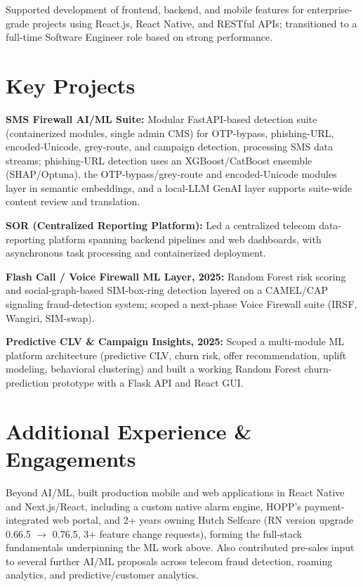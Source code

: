 \documentclass[10.5pt]{article}
\begin{document}
\begin{cvitems}
  \item Supported development of frontend, backend, and mobile features for enterprise-grade projects using React.js, React Native, and RESTful APIs; transitioned to a full-time Software Engineer role based on strong performance.
\end{cvitems}

\section*{Key Projects}
\begin{cvitems}
  \item \textbf{SMS Firewall AI/ML Suite:} Modular FastAPI-based detection suite (containerized modules, single admin CMS) for OTP-bypass, phishing-URL, encoded-Unicode, grey-route, and campaign detection, processing SMS data streams; phishing-URL detection uses an XGBoost/CatBoost ensemble (SHAP/Optuna), the OTP-bypass/grey-route and encoded-Unicode modules layer in semantic embeddings, and a local-LLM GenAI layer supports suite-wide content review and translation.
  \item \textbf{SOR (Centralized Reporting Platform):} Led a centralized telecom data-reporting platform spanning backend pipelines and web dashboards, with asynchronous task processing and containerized deployment.
  \item \textbf{Flash Call / Voice Firewall ML Layer, 2025:} Random Forest risk scoring and social-graph-based SIM-box-ring detection layered on a CAMEL/CAP signaling fraud-detection system; scoped a next-phase Voice Firewall suite (IRSF, Wangiri, SIM-swap).
  \item \textbf{Predictive CLV \& Campaign Insights, 2025:} Scoped a multi-module ML platform architecture (predictive CLV, churn risk, offer recommendation, uplift modeling, behavioral clustering) and built a working Random Forest churn-prediction prototype with a Flask API and React GUI.
\end{cvitems}

\section*{Additional Experience \& Engagements}
Beyond AI/ML, built production mobile and web applications in React Native and Next.js/React, including a custom native alarm engine, HOPP's payment-integrated web portal, and 2+ years owning Hutch Selfcare (RN version upgrade 0.66.5 $\rightarrow$ 0.76.5, 3+ feature change requests), forming the full-stack fundamentals underpinning the ML work above. Also contributed pre-sales input to several further AI/ML proposals across telecom fraud detection, roaming analytics, and predictive/customer analytics.
\end{document}
